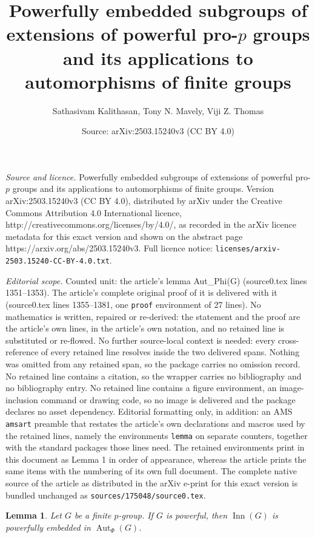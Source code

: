\documentclass[10pt,a4paper]{amsart}
\title{Powerfully embedded subgroups of extensions of powerful pro-$p$ groups and its applications to automorphisms of finite groups}
\author{Sathasivam Kalithasan, Tony N. Mavely, Viji Z. Thomas}
\date{Source: arXiv:2503.15240v3 (CC BY 4.0)}
\newtheorem{lemma}{Lemma}
\begin{document}
\maketitle

\noindent\emph{Source and licence.} Powerfully embedded subgroups of extensions of powerful pro-$p$ groups and its applications to automorphisms of finite groups. Version arXiv:2503.15240v3 (CC BY 4.0), distributed by arXiv under the Creative Commons Attribution 4.0 International licence, http://creativecommons.org/licenses/by/4.0/, as recorded in the arXiv licence metadata for this exact version and shown on the abstract page https://arxiv.org/abs/2503.15240v3. Full licence notice: \texttt{licenses/arxiv-2503.15240-CC-BY-4.0.txt}.\par\smallskip

\noindent\textit{Editorial scope.} Counted unit: the article's lemma Aut\_Phi(G) (source0.tex lines 1351--1353). The article's complete original proof of it is delivered with it (source0.tex lines 1355--1381, one \texttt{proof} environment of 27 lines). No mathematics is written, repaired or re-derived: the statement and the proof are the article's own lines, in the article's own notation, and no retained line is substituted or re-flowed.  No further source-local context is needed: every cross-reference of every retained line resolves inside the two delivered spans.  Nothing was omitted from any retained span, so the package carries no omission record.  No retained line contains a citation, so the wrapper carries no bibliography and no bibliography entry.  No retained line contains a figure environment, an image-inclusion command or drawing code, so no image is delivered and the package declares no asset dependency.  Editorial formatting only, in addition: an AMS \texttt{amsart} preamble that restates the article's own declarations and macros used by the retained lines, namely the environments \texttt{lemma} on separate counters, together with the standard packages those lines need.  The retained environments print in this document as Lemma 1 in order of appearance, whereas the article prints the same items with the numbering of its own full document.  The complete native source of the article as distributed in the arXiv e-print for this exact version is bundled unchanged as \texttt{sources/175048/source0.tex}.
\begin{lemma} \label{InnG powerfully embedded in Aut_Phi(G)}
Let $G$ be a finite $p$-group. If $G$ is powerful, then $\operatorname{Inn}(G)$ is powerfully embedded in $\operatorname{Aut}_\Phi(G)$. 
\end{lemma}
\end{document}

